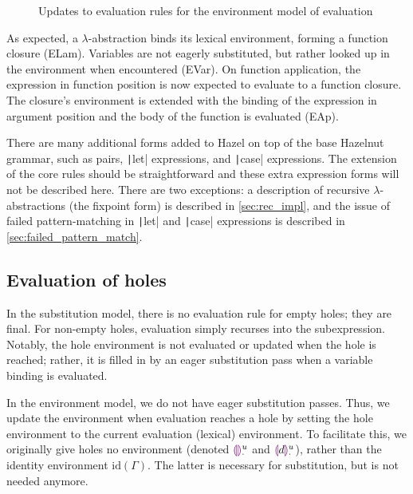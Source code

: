 \begin{figure}
  \centering
  \begin{mdframed}
    \begin{singlespace}
      
    \end{singlespace}
  \end{mdframed}
  \caption{Updates to evaluation rules for the environment model of evaluation}
  \label{fig:big-step-formal}
\end{figure}

As expected, a $\lambda$-abstraction binds its lexical environment, forming a function closure (ELam). Variables are not eagerly substituted, but rather looked up in the environment when encountered (EVar). On function application, the expression in function position is now expected to evaluate to a function closure. The closure's environment is extended with the binding of the expression in argument position and the body of the function is evaluated (EAp).

There are many additional forms added to Hazel on top of the base Hazelnut grammar, such as pairs, \texttt|let| expressions, and \texttt|case| expressions. The extension of the core rules should be straightforward and these extra expression forms will not be described here. There are two exceptions: a description of recursive $\lambda$-abstractions (the fixpoint form) is described in \cref{sec:rec_impl}, and the issue of failed pattern-matching in \texttt|let| and \texttt|case| expressions is described in \cref{sec:failed_pattern_match}.

\subsection{Evaluation of holes}
\label{sec:holeenv_evalenv_connection}

In the substitution model, there is no evaluation rule for empty holes; they are final. For non-empty holes, evaluation simply recurses into the subexpression. Notably, the hole environment is not evaluated or updated when the hole is reached; rather, it is filled in by an eager substitution pass when a variable binding is evaluated.

In the environment model, we do not have eager substitution passes. Thus, we update the environment when evaluation reaches a hole by setting the hole environment to the current evaluation (lexical) environment. To facilitate this, we originally give holes no environment (denoted $\textcolor{violet}{\llparenthesis}\textcolor{violet}{\rrparenthesis}_\cdot^u$ and $\textcolor{violet}{\llparenthesis} d\textcolor{violet}{\rrparenthesis}_\cdot^u$), rather than the identity environment $\text{id}(\Gamma)$. The latter is necessary for substitution, but is not needed anymore.

